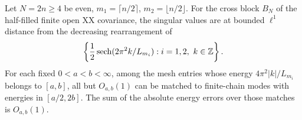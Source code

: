 \begin{corollary}
\label{cor:xx-mesh}
Let $N=2n\ge4$ be even, $m_1=\lceil n/2\rceil$,
$m_2=\lfloor n/2\rfloor$. For the cross block $B_N$ of the
half-filled finite open XX covariance, the singular values are at
bounded $\ell^1$ distance from the decreasing rearrangement of
\begin{equation}
\left\{\frac12\operatorname{sech}(2\pi^2 k/L_{m_i}):
              i=1,2,\ k\in\mathbb Z\right\}.
\label{eq:xx-explicit-mesh}
\end{equation}
For each fixed $0<a<b<\infty$, among the mesh entries whose
energy $4\pi^2|k|/L_{m_i}$ belongs to $[a,b]$, all but $O_{a,b}(1)$
can be matched to finite-chain modes with energies in $[a/2,2b]$.
The sum of the absolute energy errors over those matches is $O_{a,b}(1)$.
\end{corollary}

